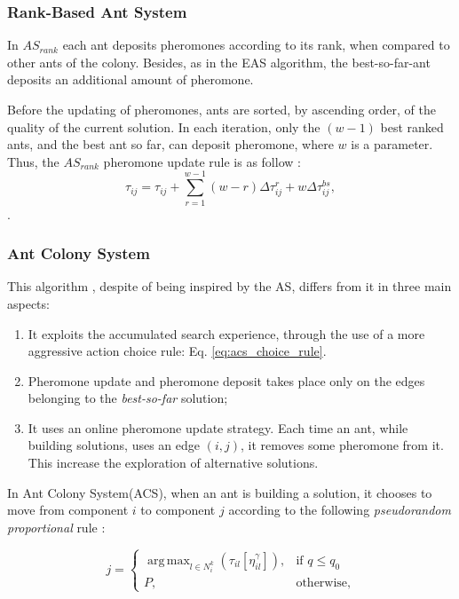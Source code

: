 					\subsubsection*{Rank-Based Ant System}

					In $AS_{rank}$ each ant deposits pheromones according to its rank, when compared to other ants of the colony. Besides, as in the EAS algorithm, the best-so-far-ant deposits an additional amount of pheromone.

					Before the updating of pheromones, ants are sorted, by ascending order, of the quality of the current solution. In each iteration, only the $(w-1)$ best ranked ants, and the best ant so far, can deposit pheromone, where $w$ is a parameter. Thus, the $AS_{rank}$ pheromone update rule is as follow \cite{bullnheimer97}:
					\begin{equation}
						\label{eq:asrank_pheromone_update}
						\tau_{ij} = \tau_{ij} + \sum_{r=1}^{w-1}(w-r)\Delta\tau_{ij}^r + w\Delta\tau_{ij}^{bs},
					\end{equation}.

					\subsubsection*{Ant Colony System}
					\label{sec:acs}
					This algorithm \cite{dorigo97}, despite of being inspired by the AS, differs from it in three main aspects:
					\begin{enumerate}
						\item It exploits the accumulated search experience, through the use of a more aggressive action choice rule: Eq. \ref{eq:acs_choice_rule}. 
						\item Pheromone update and pheromone deposit takes place only on the edges belonging to the \emph{best-so-far} solution;
						\item It uses an online pheromone update strategy. Each time an ant, while building solutions, uses an edge $(i,j)$, it removes some pheromone from it. This increase the exploration of alternative solutions.
					\end{enumerate}

					In Ant Colony System(ACS), when an ant is building a solution, it chooses to move from component $i$ to component $j$ according to the following \emph{pseudorandom proportional} rule \cite{dorigo97}:

					\begin{equation} 
						\label{eq:acs_choice_rule}
						j =
						  \begin{cases}
						   \operatorname{arg\,\max}_{l \in N_{i}^k} (\tau_{il}[\eta_{il}^{\gamma}]), & \text{if } q \leq q_{0}  \\
						  	P, & \text{otherwise,}
						  \end{cases}
					\end{equation}

